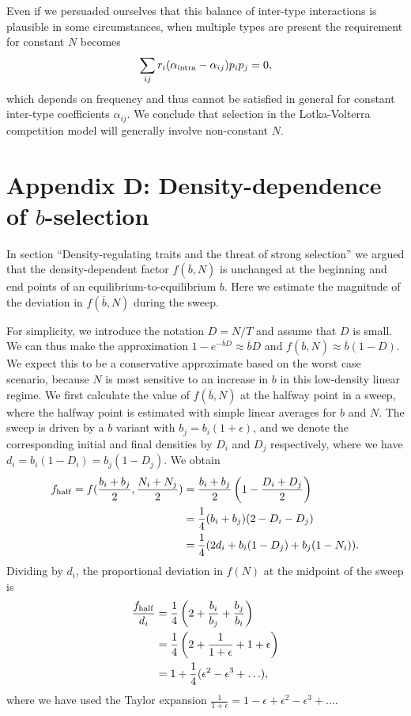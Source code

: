\documentclass[12pt]{article}
\begin{document}
Even if we persuaded ourselves that this balance of inter-type interactions is plausible in some circumstances, when multiple types are present the requirement for constant $N$ becomes
\begin{equation}
\sum_{ij}r_i(\alpha_{\rm intra}-\alpha_{ij})p_ip_j=0,
\end{equation}
which depends on frequency and thus cannot be satisfied in general for constant inter-type coefficients $\alpha_{ij}$. We conclude that selection in the Lotka-Volterra competition model will generally involve non-constant $N$.

\section*{Appendix D: Density-dependence of $b$-selection}

In section ``Density-regulating traits and the threat of strong selection'' we argued that the density-dependent factor $f(\overline{b},N)$ is unchanged at the beginning and end points of an equilibrium-to-equilibrium $b$. Here we estimate the magnitude of the deviation in $f(\overline{b},N)$ during the sweep. 

For simplicity, we introduce the notation $D=N/T$ and assume that $D$ is small. We can thus make the approximation $1-e^{-\overline{b}D}\approx \overline{b}D$ and $f(\overline{b},N)\approx \overline{b}(1-D)$. We expect this to be a conservative approximate based on the worst case scenario, because $N$ is most sensitive to an increase in $b$ in this low-density linear regime. We first calculate the value of $f(\overline{b},N)$ at the halfway point in a sweep, where the halfway point is estimated with simple linear averages for $b$ and $N$. The sweep is driven by a $b$ variant with $b_j=b_i(1+\epsilon)$, and we denote the corresponding initial and final densities by $D_i$ and $D_j$ respectively, where we have $d_i=b_i(1-D_i)=b_j(1-D_j)$. We obtain
\begin{align}
f_{\rm{half}}=f(\frac{b_i+b_j}{2},\frac{N_i+N_j}{2})&=\frac{b_i+b_j}{2}\left(1-\frac{D_i+D_j}{2}\right) \nonumber \\
&=\frac{1}{4} (b_i+b_j)(2-D_i-D_j) \nonumber \\
&=\frac{1}{4} (2d_i+b_i(1-D_j)+b_j(1-N_i)).
\end{align}
Dividing by $d_i$, the proportional deviation in $f(N)$ at the midpoint of the sweep is
\begin{align}
\frac{f_{\rm{half}}}{d_i}&=\frac{1}{4}\left(2+\frac{b_i}{b_j}+\frac{b_j}{b_i}\right)\nonumber \\
&=\frac{1}{4}\left(2+\frac{1}{1+\epsilon}+1+\epsilon\right)\nonumber \\
&=1+\frac{1}{4}(\epsilon^2-\epsilon^3+\ldots),
\end{align}
where we have used the Taylor expansion $\frac{1}{1+\epsilon}=1-\epsilon+\epsilon^2-\epsilon^3+\ldots$. 
\end{document}
